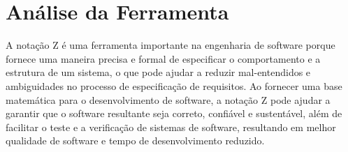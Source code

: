 \chapter{Análise da Ferramenta}

    A notação Z é uma ferramenta importante na engenharia de software porque fornece uma maneira precisa e formal de
    especificar o comportamento e a estrutura de um sistema, o que pode ajudar a reduzir mal-entendidos e ambiguidades
    no processo de especificação de requisitos. Ao fornecer uma base matemática para o desenvolvimento de software, a
    notação Z pode ajudar a garantir que o software resultante seja correto, confiável e sustentável, além de facilitar
    o teste e a verificação de sistemas de software, resultando em melhor qualidade de software e tempo de
    desenvolvimento reduzido.
